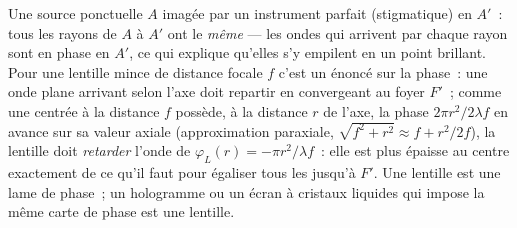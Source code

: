 \begin{example}\label{ex:b2:scalar-light-model:lens}
Une source ponctuelle $A$ imagée par un instrument parfait (stigmatique) en $A'$~:
tous les rayons de $A$ à $A'$ ont le \emph{même } --- les
ondes qui arrivent par chaque rayon sont en phase en $A'$, ce qui explique qu'elles
s'y empilent en un point brillant. Pour une lentille mince de distance focale $f$
c'est un énoncé sur la phase~: une onde plane arrivant selon l'axe
doit repartir en  convergeant au foyer $F'$~; comme une
 centrée à la distance $f$ possède, à la distance $r$ de l'axe,
la phase $2\pi r^2/2\lambda f$ en avance sur sa valeur axiale (approximation
paraxiale, $\sqrt{f^2 + r^2} \approx f + r^2/2f$), la lentille doit
\emph{retarder} l'onde de $\varphi_L(r) = -\pi r^2/\lambda f$~: elle est plus épaisse au
centre exactement de ce qu'il faut pour égaliser tous les  jusqu'à $F'$.
Une lentille est une lame de phase~; un hologramme ou un écran à cristaux liquides
qui impose la même carte de phase est une lentille.
\end{example}

